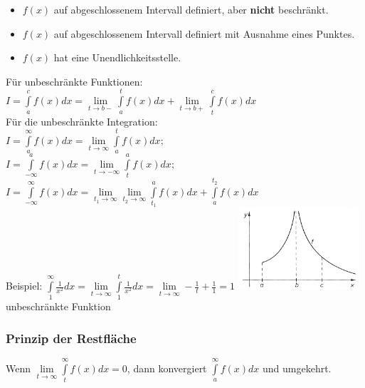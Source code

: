 	\begin{itemize}
		\setlength{\itemsep}{1pt}
		\setlength{\parskip}{0pt}
		\setlength{\parsep}{0pt}
		
	  	\item $f(x)$ auf abgeschlossenem Intervall definiert, aber \textbf{nicht}
	  	beschränkt.
		\item $f(x)$ auf abgeschlossenem Intervall definiert mit Ausnahme eines
		Punktes.
		\item $f(x)$ hat eine	 Unendlichkeitsstelle.
	\end{itemize}


  \begin{multicols}{2}
    F\"ur unbeschr\"ankte Funktionen:\\
    $ I =\int\limits _{a}^{c}f(x)dx=\lim\limits_{t\to
    b-}\int\limits_{a}^{t}f(x)dx+\lim\limits_{t\to b+}\int\limits_{t}^{c}f(x)dx
    $ \\
    F\"ur die unbeschr\"ankte Integration:\\
    $ I =\int\limits _{a} ^{\infty} f(x)dx= \lim \limits_{t\to \infty}\int \limits
    _{a} ^{t}f(x)dx; $ \\
    $ I =\int\limits ^{a} _{-\infty} f(x)dx= \lim \limits_{t\to -\infty}\int
    \limits _{t} ^{a}f(x)dx; $ \\
    $I =\int\limits _{-\infty} ^{\infty} f(x)dx = \lim \limits_{t_1\to \infty} \lim
    \limits
    _{t_2 \to  \infty}\int \limits _{t_1} ^{a}f(x)dx +
    \int\limits_{a}^{t_2}f(x)dx$\\
    Beispiel: $\int\limits_{1}^{\infty}\frac{1}{x^2}dx=\lim\limits_{t\to
    \infty}\int\limits_{1}^{t}\frac{1}{x^2}dx=\lim\limits_{t\to \infty}-\frac{1}{t}+\frac{1}{1}=1$
    \includegraphics[width=4.5cm]{./bilder/unbeschraenkteFunktion.png}\\
    unbeschr\"ankte Funktion
  \end{multicols}
  
  
    
    
\subsubsection{Prinzip der Restfl\"ache}
  Wenn $\lim\limits_{t \rightarrow \infty} \int\limits^{\infty}_{t} f(x) dx = 0$, dann konvergiert
  $\int\limits_a^{\infty} f(x) dx$ und umgekehrt.

